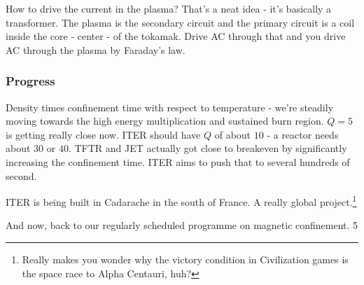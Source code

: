 \documentclass[PlasmaNotes.tex]{subfiles}
\begin{document}
How to drive the current in the plasma? That's a neat idea - it's basically a transformer. The plasma is the secondary circuit and the primary circuit is a coil inside the core - center - of the tokamak. Drive AC through that and you drive AC through the plasma by Faraday's law.

\subsubsection{Progress}
Density times confinement time with respect to temperature - we're steadily moving towards the high energy multiplication and sustained burn region. $Q = 5$ is getting really close now. ITER should have $Q$ of about $10$ - a reactor needs about $30$ or $40$. TFTR and JET actually got close to breakeven by significantly increasing the confinement time. ITER aims to push that to several hundreds of second.

ITER is being built in Cadarache in the south of France. A really global project.\footnote{Really makes you wonder why the victory condition in Civilization games is the space race to Alpha Centauri, huh?}

And now, back to our regularly scheduled programme on magnetic confinement.
5
\end{document}

